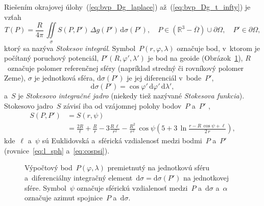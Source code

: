 \documentclass[a4paper, 12pt]{book}
\newcommand{\diff}{\mathrm d}
\begin{document}
Riešením okrajovej úlohy~(\ref{eq:bvp_Dg_laplace}) až~(\ref{eq:bvp_Dg_t_infty}) 
je vzťah
%
\begin{equation}
\label{eq:stokes}
T(P) = \frac{R}{4\pi} \, \iint\limits_{\sigma} S(P, P') \, \Delta g(P') \, 
\diff \sigma(P'){,} \quad P \in \left( \mathbb{R}^3 - \overline\Omega \right) 
\cup \partial\Omega{,} \quad P' \in \partial\Omega{,}
\end{equation}
%
ktorý sa nazýva \emph{Stokesov integrál}.  Symbol~$P(r, \varphi, \lambda)$ 
označuje bod, v~ktorom je počítaný poruchový potenciál, $P'(R, \varphi', 
\lambda')$ je bod na geoide (Obrázok~\ref{fig:surface_integral}), $R$~označuje 
polomer referenčnej sféry (napríklad stredný či rovníkový polomer Zeme), 
$\sigma$ je jednotková sféra, $\diff\sigma(P')$ je jej diferenciál v~bode~$P'$,
%
\begin{equation}
\label{eq:diff_sigma}
\diff\sigma(P') = \cos\varphi' \, \diff\varphi' \, \diff\lambda'{,}
\end{equation}
%
a~$S$ je \emph{Stokesovo integračné jadro} (niekedy tiež nazývané 
\emph{Stokesova funkcia}).  Stokesovo jadro~$S$ závisí iba od vzájomnej polohy 
bodov~$P$ a~$P'$ \parencite{MoritzPhysicalGeodesy},
%
\begin{equation}
\label{eq:stokes_kernel_general}
\begin{split}
S(P, P') &= S(r, \psi)\\
%
&= \frac{2R}{\ell} + \frac{R}{r} - 3\frac{R \, \ell}{r^2} - \frac{R^2}{r^2} \, 
\cos\psi\left( 5 + 3 \, \ln \frac{r - R \, \cos\psi + \ell}{2 \, r} \right){,}
\end{split}
\end{equation}
%
kde~$\ell$ a~$\psi$ sú Euklidovská a~sférická vzdialenosť medzi bodmi~$P$ 
a~$P'$ (rovnice~\ref{eq:l_sph} a~\ref{eq:cospsi}).

\begin{figure}[bt]
\centering

\caption{Výpočtový bod~$P(\varphi, \lambda)$ premietnutý na jednotkovú sféru 
a~diferenciálny integračný element~$\diff\sigma = \diff\sigma(P')$ na 
jednotkovej sfére.  Symbol~$\psi$ označuje sférickú vzdialenosť medzi~$P$ 
a~$\diff\sigma$ a~$\alpha$ označuje azimut spojnice~$P$ a~$\diff\sigma$.}
\label{fig:surface_integral}
\end{figure}
\end{document}
